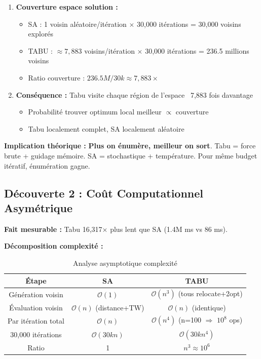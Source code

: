 \documentclass[12pt,a4paper,twoside]{report}
\begin{document}
\begin{enumerate}
    \item \textbf{Couverture espace solution :}
          \begin{itemize}
              \item SA : 1 voisin aléatoire/itération $\times$ 30,000 itérations = 30,000 voisins
                    explorés
              \item TABU : $\approx 7,883$ voisins/itération $\times$ 30,000 itérations = 236.5
                    millions voisins
              \item Ratio couverture : $236.5M / 30k \approx 7,883×$
          \end{itemize}

    \item \textbf{Conséquence : } Tabu visite chaque région de l'espace ~7,883 fois davantage
          \begin{itemize}
              \item Probabilité trouver optimum local meilleur $\propto$ couverture
              \item Tabu localement complet, SA localement aléatoire
          \end{itemize}
\end{enumerate}

\textbf{Implication théorique :} \textbf{Plus on énumère, meilleur on sort}. Tabu = force brute + guidage mémoire. SA = stochastique + température. Pour même budget itératif, énumération gagne.

\subsection{Découverte 2 : Coût Computationnel Asymétrique}

\textbf{Fait mesurable :} Tabu 16,317× plus lent que SA (1.4M ms vs 86 ms).

\textbf{Décomposition complexité :}

\begin{table}[H]
    \centering
    \caption{Analyse asymptotique complexité}
    \begin{tabular}{|c|c|c|}
        \hline
        \textbf{Étape}      & \textbf{SA}                    & \textbf{TABU}                                       \\
        \hline
        Génération voisin   & $\mathcal{O}(1)$               & $\mathcal{O}(n^3)$ (tous relocate+2opt)             \\
        Évaluation voisin   & $\mathcal{O}(n)$ (distance+TW) & $\mathcal{O}(n)$ (identique)                        \\
        Par itération total & $\mathcal{O}(n)$               & $\mathcal{O}(n^4)$ (n=100 $\Rightarrow$ $10^8$ ops) \\
        30,000 itérations   & $\mathcal{O}(30kn)$            & $\mathcal{O}(30k n^4)$                              \\
        Ratio               & 1                              & $n^3 \approx 10^6$                                  \\
        \hline
    \end{tabular}
\end{table}
\end{document}
